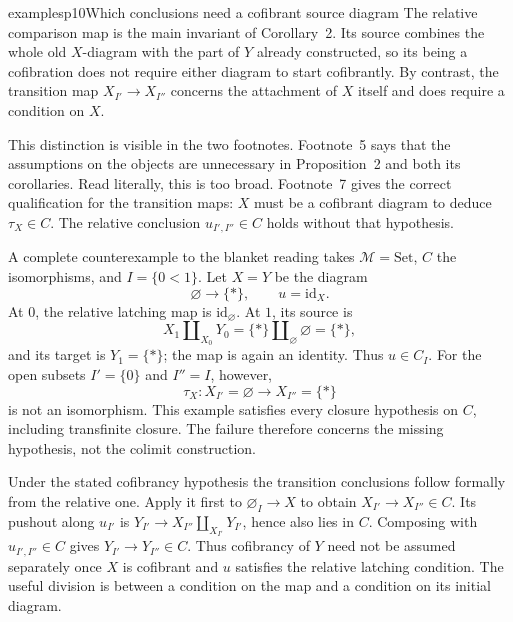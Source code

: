 \begin{dcomment}{examples}{p10}{Which conclusions need a cofibrant source diagram}
The relative comparison map is the main invariant of Corollary~2. Its source combines the whole old $X$-diagram with the part of $Y$ already constructed, so its being a cofibration does not require either diagram to start cofibrantly. By contrast, the transition map $X_{I'}\to X_{I''}$ concerns the attachment of $X$ itself and does require a condition on $X$.

This distinction is visible in the two footnotes. Footnote~5 says that the assumptions on the objects are unnecessary in Proposition~2 and both its corollaries. Read literally, this is too broad. Footnote~7 gives the correct qualification for the transition maps: $X$ must be a cofibrant diagram to deduce $\tau_X\in C$. The relative conclusion $u_{I',I''}\in C$ holds without that hypothesis.

A complete counterexample to the blanket reading takes $\mathcal M=\mathrm{Set}$, $C$ the isomorphisms, and $I=\{0<1\}$. Let $X=Y$ be the diagram
\[
 \varnothing\longrightarrow\{*\},\qquad u=\mathrm{id}_X.
\]
At $0$, the relative latching map is $\mathrm{id}_{\varnothing}$. At $1$, its source is
\[
 X_1\amalg_{X_0}Y_0=\{*\}\amalg_{\varnothing}\varnothing=\{*\},
\]
and its target is $Y_1=\{*\}$; the map is again an identity. Thus $u\in C_I$. For the open subsets $I'=\{0\}$ and $I''=I$, however,
\[
 \tau_X:X_{I'}=\varnothing\longrightarrow X_{I''}=\{*\}
\]
is not an isomorphism. This example satisfies every closure hypothesis on $C$, including transfinite closure. The failure therefore concerns the missing hypothesis, not the colimit construction.

Under the stated cofibrancy hypothesis the transition conclusions follow formally from the relative one. Apply it first to $\varnothing_I\to X$ to obtain $X_{I'}\to X_{I''}\in C$. Its pushout along $u_{I'}$ is $Y_{I'}\to X_{I''}\amalg_{X_{I'}}Y_{I'}$, hence also lies in $C$. Composing with $u_{I',I''}\in C$ gives $Y_{I'}\to Y_{I''}\in C$. Thus cofibrancy of $Y$ need not be assumed separately once $X$ is cofibrant and $u$ satisfies the relative latching condition. The useful division is between a condition on the map and a condition on its initial diagram.
\end{dcomment}

